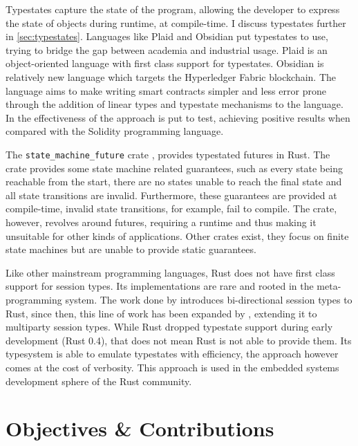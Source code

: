 Typestates capture the state of the program,
allowing the developer to express the state of objects during runtime, at compile-time.
I discuss typestates further in \autoref{sec:typestates}.
Languages like Plaid \autocite{Aldrich2009} and Obsidian \autocite{Coblenz2020, Coblenz2020a} put typestates to use,
trying to bridge the gap between academia and industrial usage.
Plaid is an object-oriented language with first class support for typestates.
Obsidian is relatively new language which targets the Hyperledger Fabric blockchain.
The language aims to make writing smart contracts simpler and less error prone
through the addition of linear types and typestate mechanisms to the language.
In \autocite{Coblenz2020} the effectiveness of the approach is put to test,
achieving positive results when compared with the Solidity programming language.

The \texttt{state\_machine\_future} crate \autocite{Fitzgerald2019}, provides typestated futures in Rust.
The crate provides some state machine related guarantees, such as every state being reachable from the start,
there are no states unable to reach the final state and all state transitions are invalid.
Furthermore, these guarantees are provided at compile-time, invalid state transitions, for example, fail to compile.
The crate, however, revolves around futures, requiring a runtime and thus making it unsuitable for other kinds of applications.
Other crates exist, they focus on finite state machines but are unable to provide static guarantees.

Like other mainstream programming languages, Rust does not have first class support for session types.
Its implementations are rare and rooted in the meta-programming system.
The work done by \autocite{Jespersen2015, Munksgaard2015} introduces bi-directional session types to Rust,
since then, this line of work has been expanded by \autocite{Lagaillardie2020},
extending it to multiparty session types.
While Rust dropped typestate support during early development (Rust 0.4), that does not mean Rust is not able to provide them.
Its typesystem is able to emulate typestates with efficiency, the approach however comes at the cost of verbosity.
This approach is used in the embedded systems development sphere of the Rust community.


\section{Objectives \& Contributions}\label{sec:objectives}

